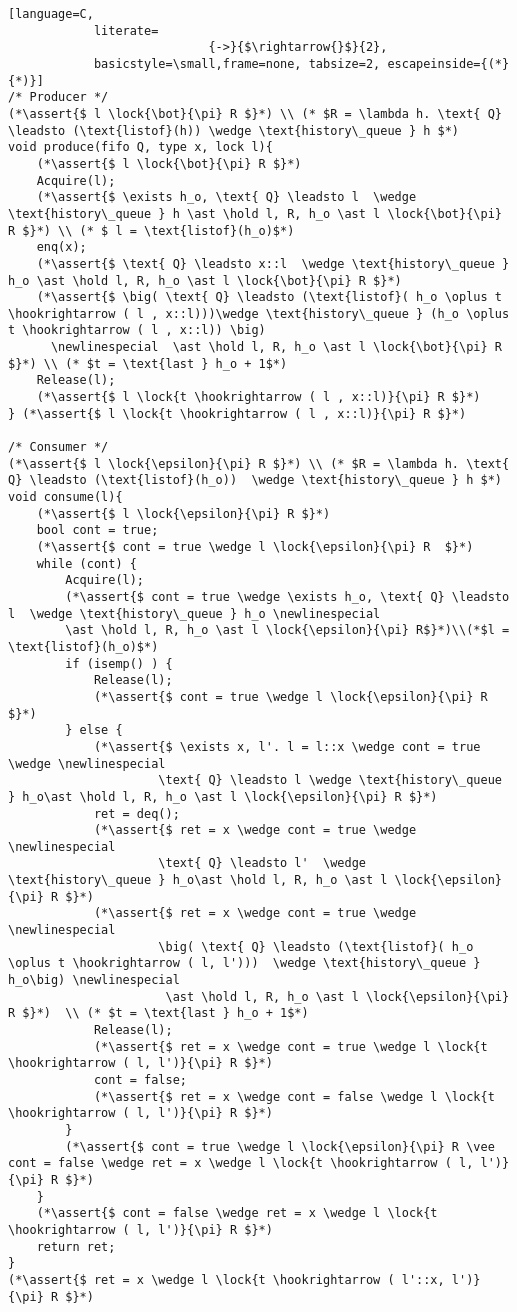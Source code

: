 \documentclass[8pt]{article}
\newcommand{\lock}[2]{ \square \hspace{-1ex} \xrightarrow[#1]{#2}}
\newcommand{\hold}{\text{Hold }}
\newcommand{\assert}[1]{\textcolor{blue}{ \{ #1 \}  } }
\newcommand{\newlinespecial}{\newline \hphantom{100pt}}
\begin{document}
\begin{lstlisting}[language=C,
			literate=
               				{->}{$\rightarrow{}$}{2},
			basicstyle=\small,frame=none, tabsize=2, escapeinside={(*}{*)}]
/* Producer */
(*\assert{$ l \lock{\bot}{\pi} R $}*) \\ (* $R = \lambda h. \text{ Q} \leadsto (\text{listof}(h)) \wedge \text{history\_queue } h $*)
void produce(fifo Q, type x, lock l){
	(*\assert{$ l \lock{\bot}{\pi} R $}*)
	Acquire(l);
	(*\assert{$ \exists h_o, \text{ Q} \leadsto l  \wedge \text{history\_queue } h \ast \hold l, R, h_o \ast l \lock{\bot}{\pi} R $}*) \\ (* $ l = \text{listof}(h_o)$*)
	enq(x);
	(*\assert{$ \text{ Q} \leadsto x::l  \wedge \text{history\_queue } h_o \ast \hold l, R, h_o \ast l \lock{\bot}{\pi} R $}*)
	(*\assert{$ \big( \text{ Q} \leadsto (\text{listof}( h_o \oplus t \hookrightarrow ( l , x::l)))\wedge \text{history\_queue } (h_o \oplus t \hookrightarrow ( l , x::l)) \big)
	  \newlinespecial  \ast \hold l, R, h_o \ast l \lock{\bot}{\pi} R $}*) \\ (* $t = \text{last } h_o + 1$*)
	Release(l);
	(*\assert{$ l \lock{t \hookrightarrow ( l , x::l)}{\pi} R $}*)
} (*\assert{$ l \lock{t \hookrightarrow ( l , x::l)}{\pi} R $}*)
	
/* Consumer */
(*\assert{$ l \lock{\epsilon}{\pi} R $}*) \\ (* $R = \lambda h. \text{ Q} \leadsto (\text{listof}(h_o))  \wedge \text{history\_queue } h $*)
void consume(l){
	(*\assert{$ l \lock{\epsilon}{\pi} R $}*)
	bool cont = true;
	(*\assert{$ cont = true \wedge l \lock{\epsilon}{\pi} R  $}*)
	while (cont) {
		Acquire(l);
		(*\assert{$ cont = true \wedge \exists h_o, \text{ Q} \leadsto l  \wedge \text{history\_queue } h_o \newlinespecial
		\ast \hold l, R, h_o \ast l \lock{\epsilon}{\pi} R$}*)\\(*$l = \text{listof}(h_o)$*)
		if (isemp() ) {
			Release(l);
			(*\assert{$ cont = true \wedge l \lock{\epsilon}{\pi} R  $}*)	
		} else {
			(*\assert{$ \exists x, l'. l = l::x \wedge cont = true \wedge \newlinespecial
					 \text{ Q} \leadsto l \wedge \text{history\_queue } h_o\ast \hold l, R, h_o \ast l \lock{\epsilon}{\pi} R $}*)
			ret = deq();
			(*\assert{$ ret = x \wedge cont = true \wedge \newlinespecial
					 \text{ Q} \leadsto l'  \wedge \text{history\_queue } h_o\ast \hold l, R, h_o \ast l \lock{\epsilon}{\pi} R $}*)
			(*\assert{$ ret = x \wedge cont = true \wedge \newlinespecial
					 \big( \text{ Q} \leadsto (\text{listof}( h_o \oplus t \hookrightarrow ( l, l')))  \wedge \text{history\_queue } h_o\big) \newlinespecial
					  \ast \hold l, R, h_o \ast l \lock{\epsilon}{\pi} R $}*)  \\ (* $t = \text{last } h_o + 1$*)
			Release(l);
			(*\assert{$ ret = x \wedge cont = true \wedge l \lock{t \hookrightarrow ( l, l')}{\pi} R $}*)
			cont = false;
			(*\assert{$ ret = x \wedge cont = false \wedge l \lock{t \hookrightarrow ( l, l')}{\pi} R $}*)
		}
		(*\assert{$ cont = true \wedge l \lock{\epsilon}{\pi} R \vee  cont = false \wedge ret = x \wedge l \lock{t \hookrightarrow ( l, l')}{\pi} R $}*)	
	}
	(*\assert{$ cont = false \wedge ret = x \wedge l \lock{t \hookrightarrow ( l, l')}{\pi} R $}*)		
	return ret;
}
(*\assert{$ ret = x \wedge l \lock{t \hookrightarrow ( l'::x, l')}{\pi} R $}*)


\end{lstlisting}
\end{document}
